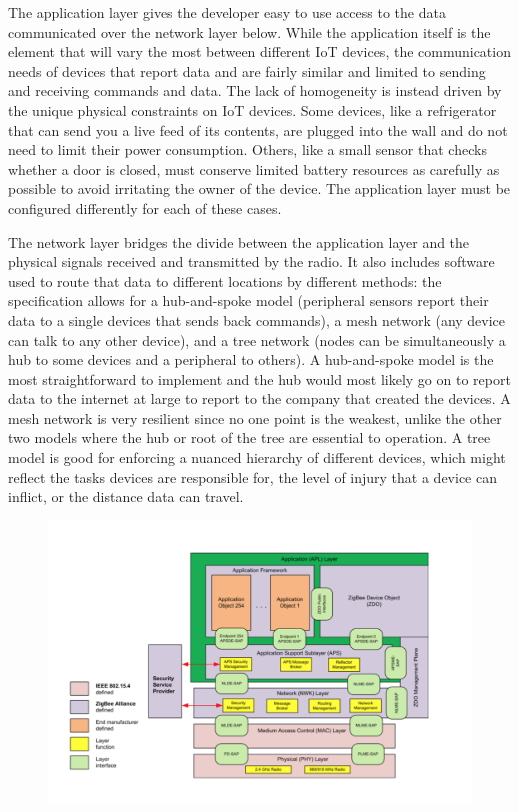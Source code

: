 The application layer gives the developer easy to use access to the data communicated over the network layer below. While the application itself is the element that will vary the most between different IoT devices, the communication needs of devices that report data and are fairly similar and limited to sending and receiving commands and data. The lack of homogeneity is instead driven by the unique physical constraints on IoT devices. Some devices, like a refrigerator that can send you a live feed of its contents, are plugged into the wall and do not need to limit their power consumption. Others, like a small sensor that checks whether a door is closed, must conserve limited battery resources as carefully as possible to avoid irritating the owner of the device. The application layer must be configured differently for each of these cases.

The network layer bridges the divide between the application layer and the physical signals received and transmitted by the radio. It also includes software used to route that data to different locations by different methods: the specification allows for a hub-and-spoke model (peripheral sensors report their data to a single devices that sends back commands), a mesh network (any device can talk to any other device), and a tree network (nodes can be simultaneously a hub to some devices and a peripheral to others). A hub-and-spoke model is the most straightforward to implement and the hub would most likely go on to report data to the internet at large to report to the company that created the devices. A mesh network is very resilient since no one point is the weakest, unlike the other two models where the hub or root of the tree are essential to operation. A tree model is good for enforcing a nuanced hierarchy of different devices, which might reflect the tasks devices are responsible for, the level of injury that a device can inflict, or the distance data can travel.

\begin{figure}[h]
	\includegraphics[width=1.0\textwidth]{top}
\end{figure}


